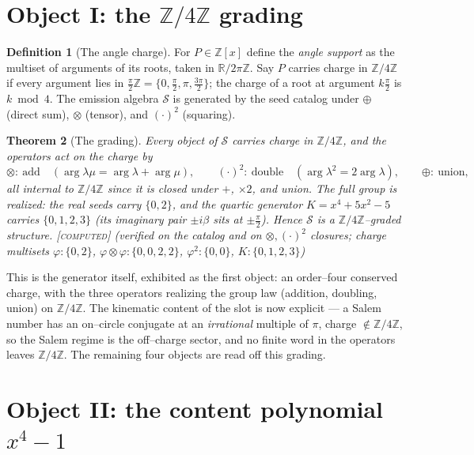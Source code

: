 \documentclass[11pt]{article}
\theoremstyle{plain}
\newtheorem{theorem}{Theorem}[section]
\theoremstyle{definition}
\newtheorem{definition}[theorem]{Definition}
\theoremstyle{remark}
\newcommand{\computed}{\textcolor{forcedc}{\textsc{[computed]}}}
\newcommand{\R}{\mathbb{R}}
\newcommand{\Z}{\mathbb{Z}}
\newcommand{\Scal}{\mathcal{S}}
\begin{document}
\section{Object I: the \texorpdfstring{$\Z/4\Z$}{Z/4Z} grading}\label{sec:gradingI}

\begin{definition}[The angle charge]\label{def:charge}
For $P\in\Z[x]$ define the \emph{angle support} as the multiset of arguments of its roots, taken in $\R/2\pi\Z$. Say $P$ carries charge in $\Z/4\Z$ if every argument lies in $\tfrac\pi2\Z=\{0,\tfrac\pi2,\pi,\tfrac{3\pi}2\}$; the charge of a root at argument $k\tfrac\pi2$ is $k\bmod 4$. The emission algebra $\Scal$ is generated by the seed catalog under $\oplus$ (direct sum), $\otimes$ (tensor), and $(\cdot)^2$ (squaring).
\end{definition}

\begin{theorem}[The grading]\label{thm:charge}
Every object of $\Scal$ carries charge in $\Z/4\Z$, and the operators act on the charge by
\[
\otimes:\ \text{add}\quad(\arg\lambda\mu=\arg\lambda+\arg\mu),\qquad
(\cdot)^2:\ \text{double}\quad(\arg\lambda^2=2\arg\lambda),\qquad
\oplus:\ \text{union},
\]
all internal to $\Z/4\Z$ since it is closed under $+$, $\times2$, and union. The full group is realized: the real seeds carry $\{0,2\}$, and the quartic generator $K=x^4+5x^2-5$ carries $\{0,1,2,3\}$ (its imaginary pair $\pm i\beta$ sits at $\pm\tfrac\pi2$). Hence $\Scal$ is a $\Z/4\Z$--graded structure. \computed{} {\small(verified on the catalog and on $\otimes,(\cdot)^2$ closures; charge multisets $\varphi{:}\{0,2\}$, $\varphi{\otimes}\varphi{:}\{0,0,2,2\}$, $\varphi^2{:}\{0,0\}$, $K{:}\{0,1,2,3\}$)}
\end{theorem}

This is the generator itself, exhibited as the first object: an order--four conserved charge, with the three operators realizing the group law (addition, doubling, union) on $\Z/4\Z$. The kinematic content of the slot is now explicit --- a Salem number has an on--circle conjugate at an \emph{irrational} multiple of $\pi$, charge $\notin\Z/4\Z$, so the Salem regime is the off--charge sector, and no finite word in the operators leaves $\Z/4\Z$. The remaining four objects are read off this grading.

\section{Object II: the content polynomial \texorpdfstring{$x^4-1$}{x4-1}}\label{sec:contentII}
\end{document}

